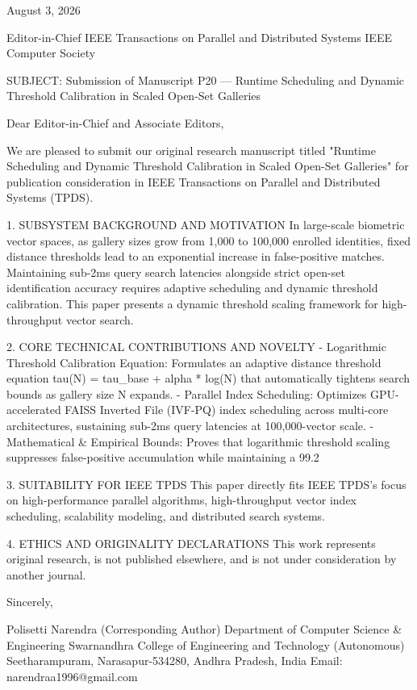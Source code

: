 August 3, 2026

Editor-in-Chief
IEEE Transactions on Parallel and Distributed Systems
IEEE Computer Society

SUBJECT: Submission of Manuscript P20 — Runtime Scheduling and Dynamic Threshold Calibration in Scaled Open-Set Galleries

Dear Editor-in-Chief and Associate Editors,

We are pleased to submit our original research manuscript titled "Runtime Scheduling and Dynamic Threshold Calibration in Scaled Open-Set Galleries" for publication consideration in IEEE Transactions on Parallel and Distributed Systems (TPDS).

1. SUBSYSTEM BACKGROUND AND MOTIVATION
In large-scale biometric vector spaces, as gallery sizes grow from 1,000 to 100,000 enrolled identities, fixed distance thresholds lead to an exponential increase in false-positive matches. Maintaining sub-2ms query search latencies alongside strict open-set identification accuracy requires adaptive scheduling and dynamic threshold calibration. This paper presents a dynamic threshold scaling framework for high-throughput vector search.

2. CORE TECHNICAL CONTRIBUTIONS AND NOVELTY
  - Logarithmic Threshold Calibration Equation: Formulates an adaptive distance threshold equation tau(N) = tau_base + alpha * log(N) that automatically tightens search bounds as gallery size N expands.
  - Parallel Index Scheduling: Optimizes GPU-accelerated FAISS Inverted File (IVF-PQ) index scheduling across multi-core architectures, sustaining sub-2ms query latencies at 100,000-vector scale.
  - Mathematical & Empirical Bounds: Proves that logarithmic threshold scaling suppresses false-positive accumulation while maintaining a 99.2%

3. SUITABILITY FOR IEEE TPDS
This paper directly fits IEEE TPDS's focus on high-performance parallel algorithms, high-throughput vector index scheduling, scalability modeling, and distributed search systems.

4. ETHICS AND ORIGINALITY DECLARATIONS
This work represents original research, is not published elsewhere, and is not under consideration by another journal.

Sincerely,

Polisetti Narendra (Corresponding Author)
Department of Computer Science & Engineering
Swarnandhra College of Engineering and Technology (Autonomous)
Seetharampuram, Narasapur-534280, Andhra Pradesh, India
Email: narendraa1996@gmail.com
